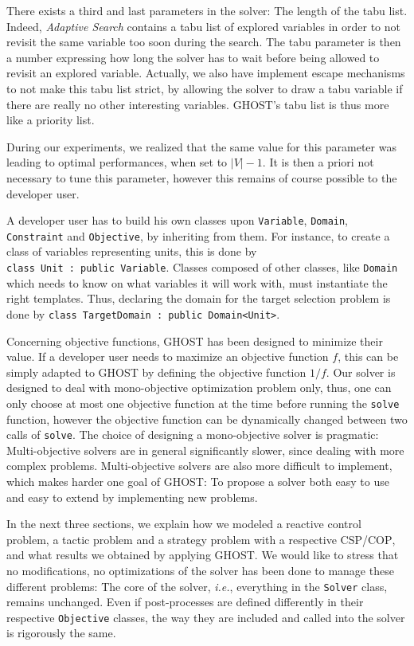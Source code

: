\documentclass[journal]{IEEEtran}
\newcommand{\csp}{\textsc{CSP}\xspace}
\newcommand{\cop}{\textsc{COP}\xspace}
\newcommand{\ghost}{\textsc{GHOST}\xspace}
\newcommand{\ie}{\textit{i.e.}}
\begin{document}
There exists a third and last  parameters in the solver: The length of
the tabu list.  Indeed, {\it Adaptive  Search} contains a tabu list of
explored variables in order to not  revisit the same variable too soon
during the search. The tabu parameter  is then a number expressing how
long  the solver  has  to  wait before  being  allowed  to revisit  an
explored variable. Actually, we  also have implement escape mechanisms
to not make  this tabu list strict,  by allowing the solver  to draw a
tabu   variable   if   there   are   really   no   other   interesting
variables. \ghost's tabu list is thus more like a priority list.

During  our experiments,  we realized  that  the same  value for  this
parameter was  leading to optimal  performances, when set  to $|V|-1$.
It is then a priori not necessary to tune this parameter, however this
remains of course possible to the developer user.

A developer user has to  build his own classes upon \texttt{Variable},
\texttt{Domain},   \texttt{Constraint}   and  \texttt{Objective},   by
inheriting from  them. For  instance, to create  a class  of variables
representing        units,        this        is        done        by
\texttt{class~Unit~:~public~Variable}.   Classes   composed  of  other
classes, like \texttt{Domain} which needs to know on what variables it
will work with, must instantiate  the right templates. Thus, declaring
the   domain   for  the   target   selection   problem  is   done   by
\texttt{class~TargetDomain~:~public~Domain<Unit>}.

Concerning objective  functions, \ghost has been  designed to minimize
their  value.  If  a developer  user  needs to  maximize an  objective
function $f$,  this can be  simply adapted  to \ghost by  defining the
objective  function  $1/f$.   Our  solver is  designed  to  deal  with
mono-objective optimization problem only, thus, one can only choose at
most  one   objective  function  at   the  time  before   running  the
\texttt{solve}  function,  however  the   objective  function  can  be
dynamically changed between two calls of \texttt{solve}. The choice of
designing  a  mono-objective   solver  is  pragmatic:  Multi-objective
solvers are in  general significantly slower, since  dealing with more
complex problems.  Multi-objective solvers  are also more difficult to
implement, which makes harder one goal  of \ghost: To propose a solver
both easy to use and easy to extend by implementing new problems.

In  the next  three sections,  we explain  how we  modeled a  reactive
control  problem, a  tactic  problem  and a  strategy  problem with  a
respective \csp/\cop, and what results we obtained by applying \ghost.
We would like to stress that no modifications, no optimizations of the
solver has been  done to manage these different problems:  The core of
the  solver, \ie,  everything  in the  \texttt{Solver} class,  remains
unchanged.  Even  if post-processes  are defined differently  in their
respective \texttt{Objective}  classes, the way they  are included and
called into the solver is rigorously the same.
\end{document}
